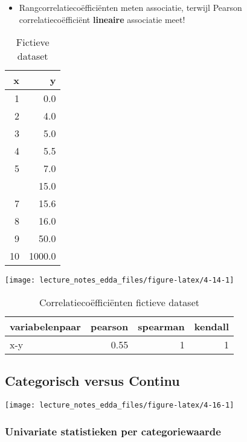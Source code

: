 \documentclass[]{memoir}
\providecommand{\tightlist}{%
  \setlength{\itemsep}{0pt}\setlength{\parskip}{0pt}}
\begin{document}
\begin{itemize}
\tightlist
\item
  Rangcorrelatiecoëfficiënten meten associatie, terwijl Pearson
  correlatiecoëfficiënt \textbf{lineaire} associatie meet!
\end{itemize}

\begin{table}[t]

\caption{\label{tab:4-13}Fictieve dataset}
\centering
\fontsize{10}{12}\selectfont
\begin{tabular}{rr}
\toprule
x & y\\
\midrule
1 & 0.0\\
2 & 4.0\\
3 & 5.0\\
4 & 5.5\\
5 & 7.0\\
\addlinespace
6 & 15.0\\
7 & 15.6\\
8 & 16.0\\
9 & 50.0\\
10 & 1000.0\\
\bottomrule
\end{tabular}
\end{table}

\texttt{[image: lecture\_notes\_edda\_files/figure-latex/4-14-1]}

\begin{table}[t]

\caption{\label{tab:4-15}Correlatiecoëfficiënten fictieve dataset}
\centering
\fontsize{10}{12}\selectfont
\begin{tabular}{lrrr}
\toprule
variabelenpaar & pearson & spearman & kendall\\
\midrule
x-y & 0.55 & 1 & 1\\
\bottomrule
\end{tabular}
\end{table}

\subsection{Categorisch versus
Continu}\label{categorisch-versus-continu}

\texttt{[image: lecture\_notes\_edda\_files/figure-latex/4-16-1]}

\subsubsection*{Univariate statistieken per
categoriewaarde}\label{univariate-statistieken-per-categoriewaarde}
\end{document}
